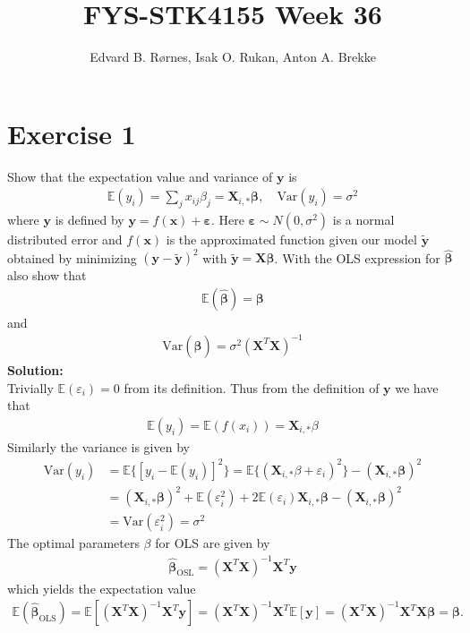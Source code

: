 \documentclass{article}
\title{FYS-STK4155 Week 36}
\author{Edvard B. Rørnes, Isak O. Rukan, Anton A. Brekke}
\begin{document}
	\maketitle
	\section*{Exercise 1}
	Show that the expectation value and variance of $\bm y$ is
	\begin{align*}
		\mathbb{E}(y_i)=\sum_{j}x_{ij}\beta_j=\bm X_{i,*}\bm\beta,\quad 
		\text{Var}(y_i)=\sigma^2
	\end{align*}
	where $\bm y$ is defined by $\bm y=f(\bm x)+\bm \varepsilon$. Here $\bm \varepsilon\sim N(0,\sigma^2)$ is a normal distributed error and $f(\bm x)$ is the approximated function given our model $\tilde{\bm y}$ obtained by minimizing $(\bm y-\tilde{\bm y})^2$ with $\tilde{\bm y}=\bm X\bm \beta$. With the OLS expression for $\hat{\bm \beta}$ also show that 
	\begin{align*}
		\mathbb{E}(\hat{\bm \beta})=\bm\beta
	\end{align*}
	and
	\begin{align*}
		\text{Var}(\hat{\bm \beta})=\sigma^2(\bm X^T\bm X)^{-1}
	\end{align*}
	\textbf{Solution:} \\
	Trivially $\mathbb{E}(\varepsilon_i)=0$ from its definition. Thus from the definition of $\bm y$ we have that
	\begin{align*}
		\mathbb{E}(y_i)=\mathbb{E}(f(x_i))=\bm X_{i,*}\beta
	\end{align*}
	Similarly the variance is given by
	\begin{align*}
		\text{Var}(y_i)&=\mathbb{E}\{[y_i-\mathbb{E}(y_i)]^2\}=\mathbb{E}\{(\bm X_{i,*}\beta+\varepsilon_i)^2\}-(\bm X_{i,*}\bm\beta)^2\\
		&=(\bm X_{i,*}\bm\beta)^2+\mathbb{E}(\varepsilon_i^2)+2\mathbb{E}(\varepsilon_i)\bm X_{i,*}\bm\beta-(\bm X_{i,*}\bm\beta)^2\\
		&=\text{Var}(\varepsilon_i^2)=\sigma^2
	\end{align*}
	The optimal parameters $\beta$ for OLS are given by
	\begin{align*}
		\hat{\bm \beta}_\text{OSL}=(\bm X^T\bm X)^{-1}\bm X^T\bm y
	\end{align*}
	which yields the expectation value
	\begin{align*}
		\mathbb{E}(\hat{\bm\beta}_\text{OLS})=\mathbb{E}[ (\bm X^T\bm X)^{-1}\bm X^T\bm y]=(\bm X^T\bm X)^{-1}\bm X^T \mathbb{E}[\bm y]=(\bm X^T\bm X)^{-1}\bm X^T\bm X\bm\beta=\bm\beta.
	\end{align*}
\end{document}
